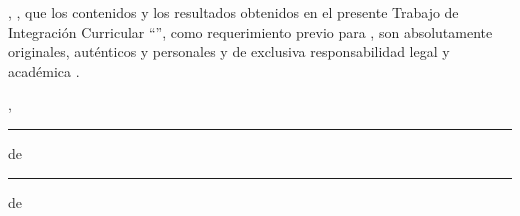 
\UTIAutoresPronombre, \UTIAutoresTexto, \UTIVerboDeclaro{} que los contenidos y los resultados obtenidos en el presente Trabajo de Integración Curricular ``\UTITituloProyecto'', como requerimiento previo para \UTIFraseObtencionTituloProfesional{}, son absolutamente originales, auténticos y personales y de exclusiva responsabilidad legal y académica \UTIAutoresResponsabilidad.

\vspace{1.5cm}

{\raggedleft
\UTICiudadPais, \rule{1.2cm}{0.4pt} de \rule{1.2cm}{0.4pt} de \UTIAnio\par}

\vspace{2.5cm}

\UTIFirmasAutoresBloque
